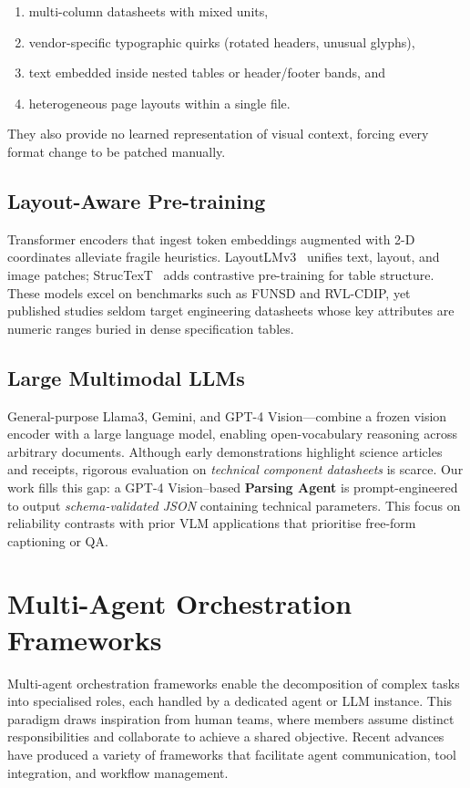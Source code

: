 \begin{enumerate}
  \item multi-column datasheets with mixed units,
  \item vendor-specific typographic quirks (rotated headers, unusual glyphs),
  \item text embedded inside nested tables or header/footer bands, and
  \item heterogeneous page layouts within a single file.
\end{enumerate}

They also provide no learned representation of visual context, forcing every
format change to be patched manually.

\subsection{Layout-Aware Pre-training}
Transformer encoders that ingest token embeddings augmented with 2-D
coordinates alleviate fragile heuristics.
LayoutLMv3~\cite{xuhuang2022layoutlmv3} unifies text, layout, and image
patches; StrucTexT~\cite{li2021structext} adds contrastive pre-training for
table structure.
These models excel on benchmarks such as FUNSD and RVL-CDIP, yet published
studies seldom target engineering datasheets whose key attributes are numeric
ranges buried in dense specification tables.

\subsection{Large Multimodal LLMs}
General-purpose Llama3, Gemini, and GPT-4 Vision—combine a frozen vision
encoder with a large language model, enabling open-vocabulary reasoning across
arbitrary documents.
Although early demonstrations highlight science articles and receipts,
rigorous evaluation on \emph{technical component datasheets} is scarce.
Our work fills this gap: a GPT-4 Vision–based \textbf{Parsing Agent} is
prompt-engineered to output \emph{schema-validated JSON} containing technical parameters.
This focus on reliability contrasts with prior VLM
applications that prioritise free-form captioning or QA.

\section{Multi-Agent Orchestration Frameworks}
Multi-agent orchestration frameworks enable the decomposition of complex tasks into specialised roles, each handled by a dedicated agent or LLM instance. This paradigm draws inspiration from human teams, where members assume distinct responsibilities and collaborate to achieve a shared objective. Recent advances have produced a variety of frameworks that facilitate agent communication, tool integration, and workflow management.

